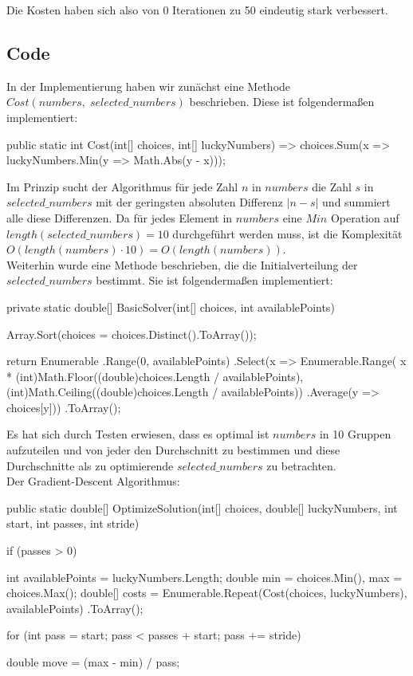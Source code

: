 \documentclass{article}
\begin{document}
\begin{flushleft}
Die Kosten haben sich also von 0 Iterationen zu 50 eindeutig stark verbessert. 
\subsection{Code}
In der Implementierung haben wir zunächst eine Methode $Cost(numbers,\;selected\_numbers)$ beschrieben. Diese ist folgendermaßen implementiert:
\begin{Csharp}
public static int Cost(int[] choices, int[] luckyNumbers) 
	=> choices.Sum(x => luckyNumbers.Min(y => Math.Abs(y - x)));
\end{Csharp}
Im Prinzip sucht der Algorithmus für jede Zahl $n$ in $numbers$ die Zahl $s$ in $selected\_numbers$ mit der geringsten absoluten Differenz $|n-s|$ und summiert alle diese Differenzen. Da für jedes Element in $numbers$ eine $Min$ Operation auf $length(selected\_numbers) = 10$ durchgeführt werden muss, ist die Komplexität $O(length(numbers)\cdot10) = O(length(numbers))$.\\
\newpage
Weiterhin wurde eine Methode beschrieben, die die Initialverteilung der $selected\_numbers$ bestimmt. Sie ist folgendermaßen implementiert:
\begin{Csharp}
private static double[] BasicSolver(int[] choices, int availablePoints)
{
    Array.Sort(choices = choices.Distinct().ToArray());

    return Enumerable
        .Range(0, availablePoints)
        .Select(x =>
            Enumerable.Range(
            	x * (int)Math.Floor((double)choices.Length / availablePoints), 
            	  (int)Math.Ceiling((double)choices.Length / availablePoints))
            .Average(y => choices[y]))
        .ToArray();
}
\end{Csharp}
Es hat sich durch Testen erwiesen, dass es optimal ist $numbers$ in 10 Gruppen aufzuteilen und von jeder den Durchschnitt zu bestimmen und diese Durchschnitte als zu optimierende $selected\_numbers$ zu betrachten.\\

Der Gradient-Descent Algorithmus:
\begin{Csharp}
public static double[] OptimizeSolution(int[] choices, double[] luckyNumbers,
	int start, int passes, int stride)
{
    if (passes > 0)
    {
        int availablePoints = luckyNumbers.Length;
        double min = choices.Min(), max = choices.Max();
        double[] costs =
        	Enumerable.Repeat(Cost(choices, luckyNumbers), availablePoints)
        	.ToArray();

        for (int pass = start; pass < passes + start; pass += stride)
        {
            double move = (max - min) / pass;

}}}
\end{Csharp}
\end{flushleft}
\end{document}
